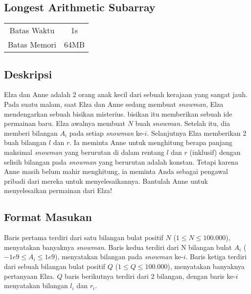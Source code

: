 \documentclass{article}
\begin{document}
\begin{center}
    \section*{Longest Arithmetic Subarray} %

    \begin{tabular}{ | c c | }
        \hline
        Batas Waktu  & 1s \\    %
        Batas Memori & 64MB \\  %
        \hline
    \end{tabular}
\end{center}

\subsection*{Deskripsi}

Elza dan Anne adalah 2 orang anak kecil dari sebuah kerajaan yang sangat jauh.
Pada suatu malam, saat Elza dan Anne sedang membuat \textit{snowman}, Elza mendengarkan sebuah bisikan misterius.
bisikan itu memberikan sebuah ide permainan baru. Elza awalnya membuat $N$ buah \textit{snowman}.
Setelah itu, dia memberi bilangan $A_i$ pada setiap \textit{snowman} ke-$i$.
Selanjutnya Elza memberikan 2 buah bilangan $l$ dan $r$. Ia meminta Anne untuk menghitung berapa panjang maksimal 
\textit{snowman} yang berurutan di dalam rentang $l$ dan $r$ (inklusif) dengan selisih bilangan pada \textit{snowman} yang 
berurutan adalah konstan. Tetapi karena Anne masih belum mahir menghitung, 
ia meminta Anda sebagai pengawal pribadi dari mereka untuk menyelesaikannya.
Bantulah Anne untuk menyelesaikan permainan dari Elza!

\subsection*{Format Masukan}

Baris pertama terdiri dari satu bilangan bulat positif $N$ ($1 \leq N \leq 100.000$), menyatakan banyaknya \textit{snowman}.
Baris kedua terdiri dari N bilangan bulat $A_i$ ($-1e9 \leq A_i \leq 1e9$), menyatakan bilangan pada \textit{snowman} ke-$i$.
Baris ketiga terdiri dari sebuah bilangan bulat positif $Q$ ($1 \leq Q \leq 100.000$), menyatakan banyaknya pertanyaan Elza.
$Q$ baris berikutnya terdiri dari 2 bilangan, dengan baris ke-$i$ menyatakan bilangan $l_i$ dan $r_i$.
\end{document}
